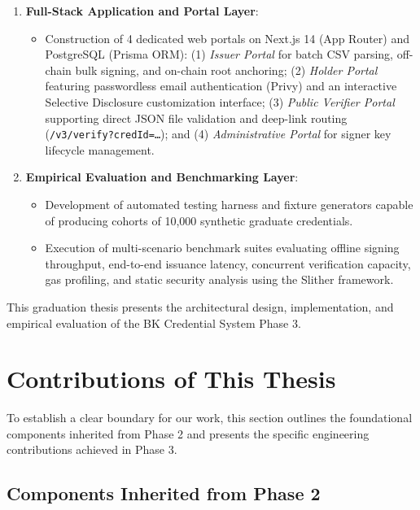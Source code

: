 \begin{enumerate}
    \item \textbf{Full-Stack Application and Portal Layer}:
    \begin{itemize}
        \item Construction of 4 dedicated web portals on Next.js 14 (App Router) and PostgreSQL (Prisma ORM): (1) \textit{Issuer Portal} for batch CSV parsing, off-chain bulk signing, and on-chain root anchoring; (2) \textit{Holder Portal} featuring passwordless email authentication (Privy) and an interactive Selective Disclosure customization interface; (3) \textit{Public Verifier Portal} supporting direct JSON file validation and deep-link routing (\texttt{/v3/verify?credId=\dots}); and (4) \textit{Administrative Portal} for signer key lifecycle management.
    \end{itemize}

    \item \textbf{Empirical Evaluation and Benchmarking Layer}:
    \begin{itemize}
        \item Development of automated testing harness and fixture generators capable of producing cohorts of 10,000 synthetic graduate credentials.
        \item Execution of multi-scenario benchmark suites evaluating offline signing throughput, end-to-end issuance latency, concurrent verification capacity, gas profiling, and static security analysis using the Slither framework.
    \end{itemize}
\end{enumerate}

This graduation thesis presents the architectural design, implementation, and empirical evaluation of the BK Credential System Phase 3.

\section{Contributions of This Thesis}

To establish a clear boundary for our work, this section outlines the foundational components inherited from Phase 2 and presents the specific engineering contributions achieved in Phase 3.

\subsection{Components Inherited from Phase 2}


